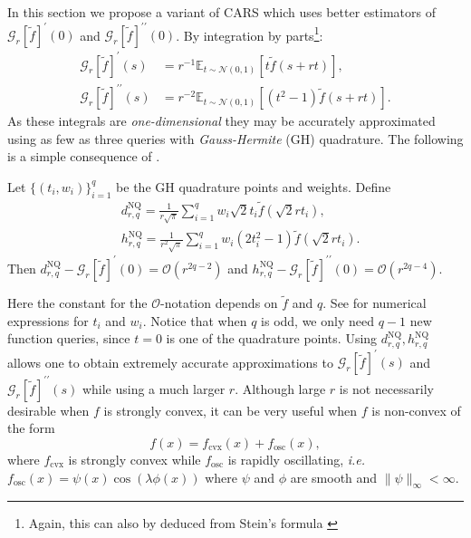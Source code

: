 In this section we propose a variant of CARS which uses better estimators of $\mathcal{G}_{r}[\tilde{f}]^{\prime}(0)$ and $\mathcal{G}_{r}[\tilde{f}]^{\prime\prime}(0)$.
By integration by parts\footnote{Again, this can also by deduced from Stein's formula \cite{stein1972bound, stein1981estimation}}:
\begin{align}
    \mathcal{G}_{r}[\tilde{f}]^{\prime}(s)       & = r^{-1}\mathbb{E}_{t \sim \mathcal{N}(0,1)}\left[t\tilde{f}(s+r t)\right], \label{eq: G_mu f'}        \\
    \mathcal{G}_{r}[\tilde{f}]^{\prime\prime}(s) & = r^{-2}\mathbb{E}_{t \sim \mathcal{N}(0,1)}\left[(t^2-1)\tilde{f}( s+r t)\right].\label{eq: G_mu f''}
\end{align}
As these integrals are {\em one-dimensional} they may be accurately approximated using as few as three queries with {\em Gauss-Hermite} (GH) quadrature. The following is a simple consequence of \cite{abramowitz1972handbook}.
\begin{lemma}\label{lemma: accuracy of GH quadrature}
    Let $\{(t_i,w_i)\}_{i=1}^{q}$ be the GH quadrature points and weights. Define
    \begin{align}
         & d^{\mathrm{NQ}}_{r,q} = \frac{1}{r\sqrt{\pi}}\sum_{i=1}^{q} w_i \sqrt{2} t_i \tilde{f}(\sqrt{2}r t_i) \label{eq: GH quadrature for f'},   \\
         & h^{\mathrm{NQ}}_{r,q} = \frac{1}{r^2\sqrt{\pi}}\sum_{i=1}^{q} w_i (2t_i^2-1) \tilde{f}(\sqrt{2} r t_i). \label{eq: GH quadrature for f''}
    \end{align}
    Then $d^{\mathrm{NQ}}_{r,q} - \mathcal{G}_{r}[\tilde{f}]^{\prime}(0) = \mathcal{O}(r^{2q-2})$ and $h^{\mathrm{NQ}}_{r,q} - \mathcal{G}_{r}[\tilde{f}]^{\prime\prime}(0) = \mathcal{O}(r^{2q-4})$.
\end{lemma}
Here the constant for the $\mathcal{O}$-notation depends on $\tilde{f}$ and $q$. See \cite{abramowitz1972handbook} for numerical expressions for $t_i$ and $w_i$. Notice that when $q$ is odd, we only need $q-1$ new function queries, since $t=0$ is one of the quadrature points. Using $d^{\mathrm{NQ}}_{r,q}, h^{\mathrm{NQ}}_{r,q}$ allows one to obtain extremely accurate approximations to $\mathcal{G}_r[\tilde{f}]^{\prime}(s)$ and $\mathcal{G}_r[\tilde{f}]^{\prime\prime}(s)$ while using a much larger $r$. Although large $r$ is not necessarily desirable when $f$ is strongly convex, it can be very useful when $f$ is non-convex of the form
\begin{equation}
    f(x) = f_{\mathrm{cvx}}(x) + f_{\mathrm{osc}}(x),
    \label{Eq:Def_Oscillatory}
\end{equation}
where $f_{\mathrm{cvx}}$ is strongly convex while $f_{\mathrm{osc}}$ is rapidly oscillating, {\em i.e.} $f_{\mathrm{osc}}(x) = \psi(x)\cos(\lambda\phi(x))$ where $\psi$ and $\phi$ are smooth and $\|\psi\|_{\infty} < \infty$. %

